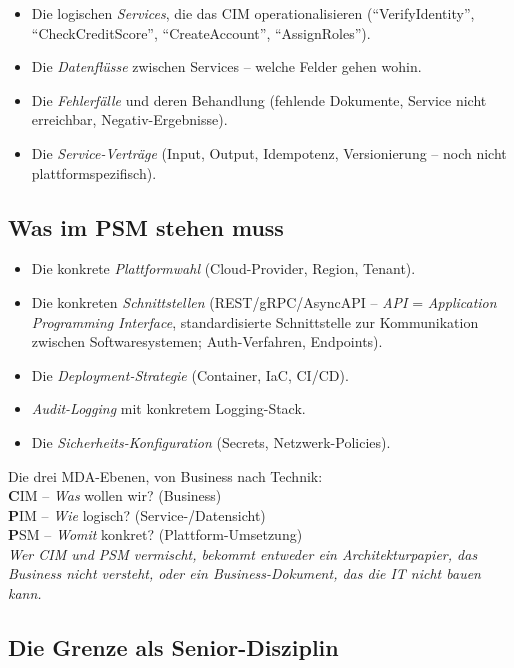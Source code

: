 \documentclass[11pt,a4paper,oneside]{article}
\newcommand{\caveatfontfallback}{\itshape}
\newcommand\caveatfont{\caveatfontfallback}%
\newcommand{\akzent}[1]{{\caveatfont\color{lpAmber}#1}}
\begin{document}
\begin{itemize}
  \item Die logischen \emph{Services}, die das CIM operationalisieren (``VerifyIdentity'', ``CheckCreditScore'', ``CreateAccount'', ``AssignRoles'').
  \item Die \emph{Datenflüsse} zwischen Services -- welche Felder gehen wohin.
  \item Die \emph{Fehlerfälle} und deren Behandlung (fehlende Dokumente, Service nicht erreichbar, Negativ-Ergebnisse).
  \item Die \emph{Service-Verträge} (Input, Output, Idempotenz, Versionierung -- noch nicht plattformspezifisch).
\end{itemize}

\subsection{Was im PSM stehen muss}

\begin{itemize}
  \item Die konkrete \emph{Plattformwahl} (Cloud-Provider, Region, Tenant).
  \item Die konkreten \emph{Schnittstellen} (REST/gRPC/AsyncAPI -- \emph{API} = \emph{Application Programming Interface}, standardisierte Schnittstelle zur Kommunikation zwischen Softwaresystemen; Auth-Verfahren, Endpoints).
  \item Die \emph{Deployment-Strategie} (Container, IaC, CI/CD).
  \item \emph{Audit-Logging} mit konkretem Logging-Stack.
  \item Die \emph{Sicherheits-Konfiguration} (Secrets, Netzwerk-Policies).
\end{itemize}

\begin{eselsbox}[Eselsbrücke: \akzent{C-P-S}]
Die drei MDA-Ebenen, von Business nach Technik:\\[2pt]
\textbf{C}IM -- \emph{Was} wollen wir? (Business)\\
\textbf{P}IM -- \emph{Wie} logisch? (Service-/Datensicht)\\
\textbf{P}SM -- \emph{Womit} konkret? (Plattform-Umsetzung)\\[2pt]
\emph{Wer CIM und PSM vermischt, bekommt entweder ein Architekturpapier, das Business nicht versteht, oder ein Business-Dokument, das die IT nicht bauen kann.}
\end{eselsbox}

\subsection{Die Grenze als Senior-Disziplin}
\end{document}
